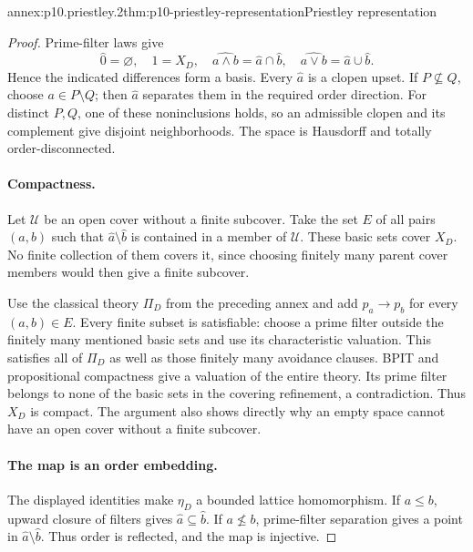 \begin{annexitem}{annex:p10.priestley.2}{thm:p10-priestley-representation}{Priestley representation}
\begin{proof}
Prime-filter laws give
\[
 \widehat0=\varnothing,\quad\widehat1=X_D,\quad
 \widehat{a\wedge b}=\widehat a\cap\widehat b,\quad
 \widehat{a\vee b}=\widehat a\cup\widehat b.
\]
Hence the indicated differences form a basis.
Every \(\widehat a\) is a clopen upset.
If \(P\not\subseteq Q\), choose \(a\in P\setminus Q\);
then \(\widehat a\) separates them in the required order direction.
For distinct \(P,Q\), one of these noninclusions holds, so an
admissible clopen and its complement give disjoint neighborhoods.
The space is Hausdorff and totally order-disconnected.

\paragraph{Compactness.}
Let \(\mathcal U\) be an open cover without a finite subcover.
Take the set \(E\) of all pairs \((a,b)\) such that
\(\widehat a\setminus\widehat b\) is contained in a member of
\(\mathcal U\).
These basic sets cover \(X_D\).
No finite collection of them covers it, since choosing finitely
many parent cover members would then give a finite subcover.

Use the classical theory \(\Pi_D\) from the preceding annex
and add \(p_a\to p_b\) for every \((a,b)\in E\).
Every finite subset is satisfiable: choose a prime filter outside
the finitely many mentioned basic sets and use its characteristic
valuation. This satisfies all of \(\Pi_D\) as well as those
finitely many avoidance clauses.
BPIT and propositional compactness give a valuation of the entire
theory. Its prime filter belongs to none of the basic sets in
the covering refinement, a contradiction.
Thus \(X_D\) is compact.
The argument also shows directly why an empty space cannot
have an open cover without a finite subcover.

\paragraph{The map is an order embedding.}
The displayed identities make \(\eta_D\) a bounded lattice
homomorphism.
If \(a\leq b\), upward closure of filters gives
\(\widehat a\subseteq\widehat b\).
If \(a\not\leq b\), prime-filter separation gives a point in
\(\widehat a\setminus\widehat b\).
Thus order is reflected, and the map is injective.


\end{proof}
\end{annexitem}
